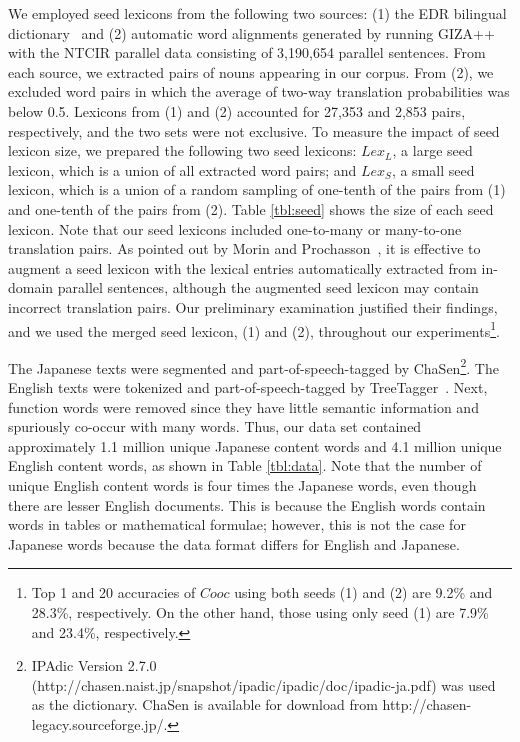 \documentclass[english]{jnlp_1.4}
\begin{document}
We employed seed lexicons from the following two sources: (1) the EDR bilingual dictionary~\cite{edr} and (2) automatic word alignments generated by running GIZA++~\cite{och03} with the NTCIR parallel data consisting of 3,190,654 parallel sentences. 
From each source, we extracted pairs of nouns appearing in our corpus. 
From (2), we excluded word pairs in which the average of two-way translation probabilities was below 0.5. 
Lexicons from (1) and (2) accounted for 27,353 and 2,853 pairs, respectively, and the two sets were not exclusive. 
To measure the impact of seed lexicon size, we prepared the following two seed lexicons: 
$Lex_{L}$, a large seed lexicon, which is a union of all extracted word pairs; 
and $Lex_{S}$, a small seed lexicon, which is a union of a random sampling of one-tenth of the pairs from (1) and one-tenth of the pairs from (2). 
Table \ref{tbl:seed} shows the size of each seed lexicon. 
Note that our seed lexicons included one-to-many or many-to-one translation pairs. 
As pointed out by Morin and Prochasson~\citeyear{morin11}, it is effective to augment a seed lexicon with the lexical entries automatically extracted from in-domain parallel sentences, although the augmented seed lexicon may contain incorrect translation pairs. 
Our preliminary examination justified their findings, and we used the merged seed lexicon, (1) and (2), throughout our experiments\footnote{Top 1 and 20 accuracies of $Cooc$ using both seeds (1) and (2) are 9.2\% and 28.3\%, respectively. On the other hand, those using only seed (1) are 7.9\% and 23.4\%, respectively.}. 

The Japanese texts were segmented and part-of-speech-tagged by ChaSen\footnote{IPAdic Version 2.7.0 ({http://chasen.naist.jp/snapshot/ipadic/ipadic/doc/ipadic-ja.pdf}) was used as the dictionary. ChaSen is available for download from {http://chasen-legacy.sourceforge.jp/}.}. 
The English texts were tokenized and part-of-speech-tagged by TreeTagger~\cite{schmid94}. 
Next, function words were removed since they have little semantic information and spuriously co-occur with many words. 
Thus, our data set contained approximately 1.1 million unique Japanese content words and 4.1 million unique English content words, as shown in Table \ref{tbl:data}. 
Note that the number of unique English content words is four times the Japanese words, even though there are lesser English documents. This is because the English words contain words in tables or mathematical formulae; however, this is not the case for Japanese words because the data format differs for English and Japanese. 
\end{document}
